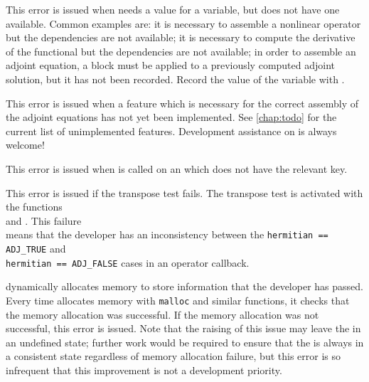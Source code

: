 This error is issued when \libadjoint needs a value for a variable, but
does not have one available. Common examples are: it is necessary to assemble
a nonlinear operator but the dependencies are not available; it is necessary to compute
the derivative of the functional but the dependencies are not available; in order to
assemble an adjoint equation, a block must be applied to a previously computed
adjoint solution, but it has not been recorded. Record the value of the variable
with .

This error is issued when a feature which is necessary for the correct assembly
of the adjoint equations has not yet been implemented. See \autoref{chap:todo}
for the current list of unimplemented features. Development assistance on
\libadjoint is always welcome!

This error is issued when  is called on an 
which does not have the relevant key.

This error is issued if the transpose test fails. The transpose test is activated
with the functions \\ and .
This failure\\ means that the developer has an inconsistency between the \texttt{hermitian == ADJ_TRUE}
and \\\texttt{hermitian == ADJ_FALSE} cases in an operator callback.

\libadjoint dynamically allocates memory to store information that the developer
has passed. Every time \libadjoint allocates memory with \texttt{malloc} and
similar functions, it checks that the memory allocation was successful. If the memory
allocation was not successful, this error is issued. Note that the raising of this
issue may leave the  in an undefined state; further work would
be required to ensure that the  is always in a consistent state
regardless of memory allocation failure, but this error is so infrequent that 
this improvement is not a \libadjoint development priority.
